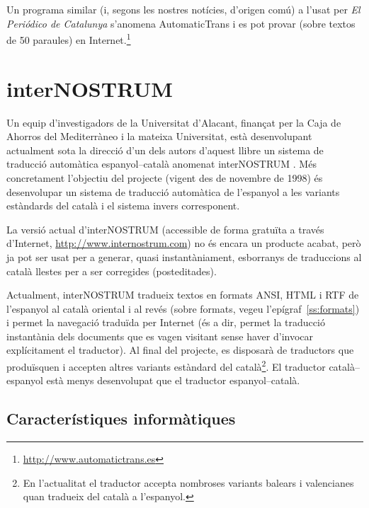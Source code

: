 Un programa similar (i, segons les nostres notícies, d'origen comú) a
l'usat per \emph{El Periódico de Catalunya} s'anomena AutomaticTrans i
es pot provar (sobre textos de 50 paraules) en
Internet.\footnote{\url{http://www.automatictrans.es}}


\section{interNOSTRUM}


Un equip d'investigadors de la Universitat d'Alacant, finançat per la
Caja de Ahorros del Mediterràneo i la mateixa Universitat, està
desenvolupant actualment sota la direcció d'un dels autors d'aquest
llibre un sistema de traducció automàtica espanyol--català anomenat
\textsf{interNOSTRUM} \citep{canals01a,canals01b}. Més concretament
l'objectiu del projecte (vigent des de novembre de 1998) és
desenvolupar un sistema de traducció automàtica de l'espanyol a les
variants estàndards del català i el sistema invers corresponent.

La versió actual d'{\sf interNOSTRUM} (accessible de forma gratuïta a
través d'Internet, \url{http://www.internostrum.com}) no és
encara un producte acabat, però ja pot ser usat per a generar, quasi
instantàniament, esborranys de traduccions al català llestes per a ser
corregides (posteditades).

Actualment, {\sf interNOSTRUM} tradueix textos en formats ANSI, HTML i
RTF de l'espanyol al català oriental i al revés (sobre formats, vegeu
l'epígraf~\ref{ss:formats}) i permet la navegació traduïda per
Internet (és a dir, permet la traducció instantània dels documents que
es vagen visitant sense haver d'invocar explícitament el traductor).
Al final del projecte, es disposarà de traductors que produïsquen i
accepten altres variants estàndard del català\footnote{En l'actualitat
  el traductor accepta nombroses variants balears i valencianes
  quan tradueix del català a l'espanyol.}. El traductor
català--espanyol està menys desenvolupat que el traductor
espanyol--català.

\subsection{Característiques informàtiques}

